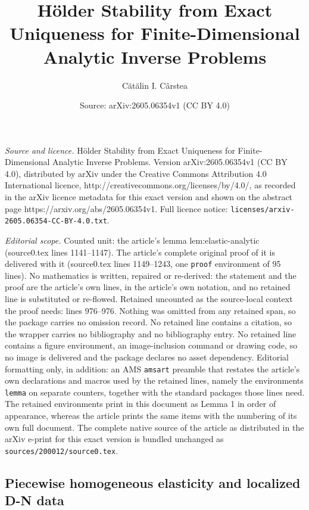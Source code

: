 \documentclass[10pt,a4paper]{amsart}
\title{H\"older Stability from Exact Uniqueness for Finite-Dimensional Analytic Inverse Problems}
\author{C\u{a}t\u{a}lin I. C\^arstea}
\date{Source: arXiv:2605.06354v1 (CC BY 4.0)}
\begin{document}
\maketitle

\noindent\emph{Source and licence.} H\"older Stability from Exact Uniqueness for Finite-Dimensional Analytic Inverse Problems. Version arXiv:2605.06354v1 (CC BY 4.0), distributed by arXiv under the Creative Commons Attribution 4.0 International licence, http://creativecommons.org/licenses/by/4.0/, as recorded in the arXiv licence metadata for this exact version and shown on the abstract page https://arxiv.org/abs/2605.06354v1. Full licence notice: \texttt{licenses/arxiv-2605.06354-CC-BY-4.0.txt}.\par\smallskip

\noindent\textit{Editorial scope.} Counted unit: the article's lemma lem:elastic-analytic (source0.tex lines 1141--1147). The article's complete original proof of it is delivered with it (source0.tex lines 1149--1243, one \texttt{proof} environment of 95 lines). No mathematics is written, repaired or re-derived: the statement and the proof are the article's own lines, in the article's own notation, and no retained line is substituted or re-flowed.  Retained uncounted as the source-local context the proof needs: lines 976--976.  Nothing was omitted from any retained span, so the package carries no omission record.  No retained line contains a citation, so the wrapper carries no bibliography and no bibliography entry.  No retained line contains a figure environment, an image-inclusion command or drawing code, so no image is delivered and the package declares no asset dependency.  Editorial formatting only, in addition: an AMS \texttt{amsart} preamble that restates the article's own declarations and macros used by the retained lines, namely the environments \texttt{lemma} on separate counters, together with the standard packages those lines need.  The retained environments print in this document as Lemma 1 in order of appearance, whereas the article prints the same items with the numbering of its own full document.  The complete native source of the article as distributed in the arXiv e-print for this exact version is bundled unchanged as \texttt{sources/200012/source0.tex}.
\subsection{Piecewise homogeneous elasticity and localized D-N data}\label{subsec:elasticity-data}
\end{document}
